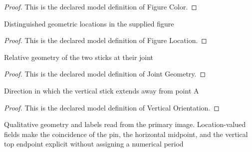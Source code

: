 \begin{proof}
  This is the declared model definition of Figure Color.
\end{proof}
\begin{definition}
  \label{def:physics:phyx-mini-0263:phyxminiproblems-problemphyxmini0263-figurelocation}
  Distinguished geometric locations in the supplied figure
\end{definition}
\begin{proof}
  This is the declared model definition of Figure Location.
\end{proof}
\begin{definition}
  \label{def:physics:phyx-mini-0263:phyxminiproblems-problemphyxmini0263-jointgeometry}
  Relative geometry of the two sticks at their joint
\end{definition}
\begin{proof}
  This is the declared model definition of Joint Geometry.
\end{proof}
\begin{definition}
  \label{def:physics:phyx-mini-0263:phyxminiproblems-problemphyxmini0263-verticalorientation}
  Direction in which the vertical stick extends away from point A
\end{definition}
\begin{proof}
  This is the declared model definition of Vertical Orientation.
\end{proof}
\begin{definition}
  \label{def:physics:phyx-mini-0263:phyxminiproblems-problemphyxmini0263-tstickfigure}
  Qualitative geometry and labels read from the primary image. Location-valued fields make the coincidence of the pin, the horizontal midpoint, and the vertical top endpoint explicit without assigning a numerical period
\end{definition}

